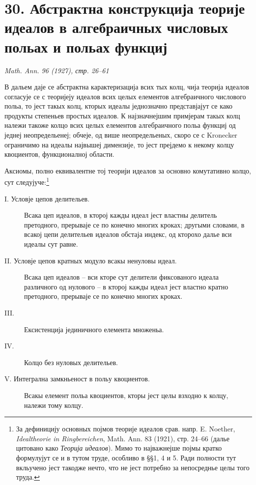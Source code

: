 ﻿\documentclass[11pt]{article}
\begin{document}
\section*{30. Абстрактна конструкција теорије идеалов в алгебраичных числовых польах и польах функциј}

\begin{center}
\emph{Math. Ann. 96 (1927), стр. 26--61}
\end{center}

В дальем даје се абстрактна карактеризација всих тых колц, чија теорија идеалов согласује се с теоријеју идеалов всих целых елементов алгебраичного числового польа, то јест такых колц, кторых идеалы једнозначно представјајут се како продукты степеньев простых идеалов. К најзначнејшим примјерам такых колц належи такоже колцо всих целых елементов алгебраичного польа функциј од једнеј неопредельенеј; обчеје, од више неопредельеных, скоро се с Kronecker ограничимо на идеалы највышеј димензије, то јест прејдемо к некому колцу квоциентов, функционалној области.

Аксиомы, полно еквивалентне тој теорији идеалов за основно комутативно колцо, сут следујуче:\footnote{За дефиницију основных појмов теорије идеалов срав. напр. E. Noether, \emph{Idealtheorie in Ringbereichen}, Math. Ann. 83 (1921), стр. 24--66 (далье цитовано како \emph{Теорија идеалов}). Мимо то најважнејше појмы кратко формулујут се и в тутом труде, особливо в §§1, 4 и 5. Ради полности тут вкльучено јест такодже нечто, что не јест потребно за непосреднье целы того труда.}

\begin{description}
\item[I. Условје цепов делительев.] Всака цеп идеалов, в кторој кажды идеал јест властны делитель претодного, прерываје се по конечно многих кроках; другыми словами, в всакој цепи делительев идеалов обстаја индекс, од кторохо далье вси идеалы сут равне.
\item[II. Условје цепов кратных модуло всакы ненуловы идеал.] Всака цеп идеалов -- вси кторе сут делители фиксованого идеала различного од нулового -- в кторој кажды идеал јест властно кратно претодного, прерываје се по конечно многих кроках.
\item[III.] Ексистенција јединичного елемента множеньа.
\item[IV.] Колцо без нуловых делительев.
\item[V. Интегрална замкньеност в польу квоциентов.] Всакы елемент польа квоциентов, кторы јест целы взходно к колцу, належи тому колцу.
\end{description}
\end{document}
